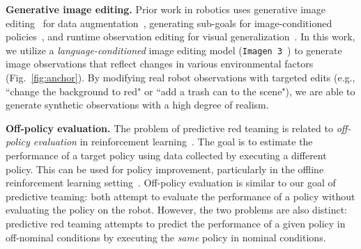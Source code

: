 {\bf Generative image editing.} Prior work in robotics uses generative image editing~\cite{baldridge2024imagen,  betker2023improving, nichol2021glide, yu2023inpaint, ling2021editgan, zhu2020domain} for data augmentation~\cite{chen2023genaug, yu2023scaling, bharadhwaj2024roboagent, chen2024rovi, chen2024semantically}, generating sub-goals for image-conditioned policies~\cite{black2023zero, shah2023vint}, and runtime observation editing for visual generalization~\cite{hancock2024run}. In this work, we utilize a \emph{language-conditioned} image editing model (\texttt{Imagen 3}~\cite{baldridge2024imagen}) to generate image observations that reflect changes in various environmental factors (Fig.~\ref{fig:anchor}). By modifying real robot observations with targeted edits (e.g., ``change the background to red" or ``add a trash can to the scene"), we are able to generate synthetic observations with a high degree of realism. 

{\bf Off-policy evaluation.} The problem of predictive red teaming is related to \emph{off-policy evaluation} in reinforcement learning~\cite{precup2000eligibility, hallak2017consistent, hanna2017bootstrapping, farajtabar2018more}. The goal is to estimate the performance of a target policy using data collected by executing a different policy. This can be used for policy improvement, particularly in the offline reinforcement learning setting~\cite{levine2020offline}. Off-policy evaluation is similar to our goal of predictive teaming: both attempt to evaluate the performance of a policy without evaluating the policy on the robot. However, the two problems are also distinct: predictive red teaming attempts to predict the performance of a given policy in off-nominal conditions by executing the \emph{same} policy in nominal conditions. 

